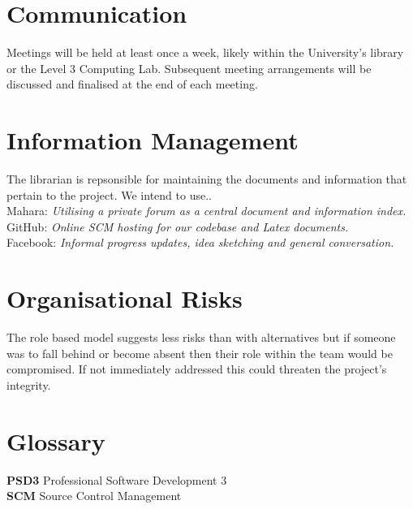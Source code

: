 \documentclass{l3deliverable}
\begin{document}

\section{Communication}

Meetings will be held at least once a week, likely within the University’s library or the Level 3 Computing
Lab. Subsequent meeting arrangements will be discussed and finalised at the end of each
meeting.


\section{Information Management}

The librarian is repsonsible for maintaining the documents and information that pertain to the project.
We intend to use..\\

Mahara: \textit{Utilising a private forum as a central document and information index.}\\
GitHub: \textit{Online SCM hosting for our codebase and Latex documents.}\\
Facebook: \textit{Informal progress updates, idea sketching and general conversation.}\\



\section{Organisational Risks}

The role based model suggests less risks than with alternatives but if someone was to fall behind or
become absent then their role within the team would be compromised. If not immediately addressed
this could threaten the project’s integrity.


\appendix

\section{Glossary}

\textbf{PSD3} Professional Software Development 3\\
\textbf{SCM} Source Control Management\\
\end{document}
